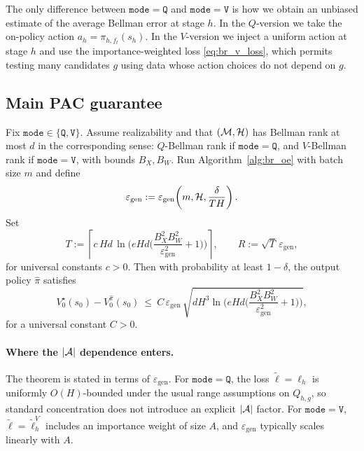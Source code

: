 The only difference between $\mathtt{mode}=\mathtt{Q}$ and $\mathtt{mode}=\mathtt{V}$ is how we obtain an
unbiased estimate of the average Bellman error at stage $h$.
In the $Q$-version we take the on-policy action $a_h=\pi_{h,f_t}(s_h)$.
In the $V$-version we inject a uniform action at stage $h$ and use the importance-weighted loss
\eqref{eq:br_v_loss}, which permits testing many candidates $g$ using data whose action choices do not
depend on $g$.


\subsection{Main PAC guarantee}
\label{subsec:br_main_thm}

\begin{theorem}
\label{thm:br_main}
Fix $\mathtt{mode}\in\{\mathtt{Q},\mathtt{V}\}$.
Assume realizability and that $(\mathcal{M},\mathcal{H})$ has Bellman rank at most $d$ in the corresponding sense:
$Q$-Bellman rank if $\mathtt{mode}=\mathtt{Q}$, and $V$-Bellman rank if $\mathtt{mode}=\mathtt{V}$,
with bounds $B_X,B_W$.
Run Algorithm~\ref{alg:br_oe} with batch size $m$ and define
\[
\varepsilon_{\mathrm{gen}} := \varepsilon_{\mathrm{gen}}\!\left(m,\mathcal{H},\frac{\delta}{TH}\right).
\]
Set
\[
T := \left\lceil c\,Hd \,\ln\!\Big( eHd\Big(\frac{B_X^2B_W^2}{\varepsilon_{\mathrm{gen}}^2}+1\Big)\Big)\right\rceil,
\qquad
R := \sqrt{T}\,\varepsilon_{\mathrm{gen}},
\]
for universal constants $c>0$.
Then with probability at least $1-\delta$, the output policy $\hat\pi$ satisfies
\[
V_0^\star(s_0) - V_0^{\hat\pi}(s_0)
\ \le\
C\,\varepsilon_{\mathrm{gen}}\,
\sqrt{dH^3\ln\!\Big( eHd\Big(\frac{B_X^2B_W^2}{\varepsilon_{\mathrm{gen}}^2}+1\Big)\Big)},
\]
for a universal constant $C>0$.
\end{theorem}

\paragraph{Where the $|\mathcal{A}|$ dependence enters.}
The theorem is stated in terms of $\varepsilon_{\mathrm{gen}}$.
For $\mathtt{mode}=\mathtt{Q}$, the loss $\tilde{\ell}=\ell_h$ is uniformly $O(H)$-bounded under the
usual range assumptions on $Q_{h,g}$, so standard concentration does not introduce an explicit $|\mathcal{A}|$
factor.
For $\mathtt{mode}=\mathtt{V}$, $\tilde{\ell}=\tilde{\ell}_h^V$ includes an importance weight of size $A$,
and $\varepsilon_{\mathrm{gen}}$ typically scales linearly with $A$.

